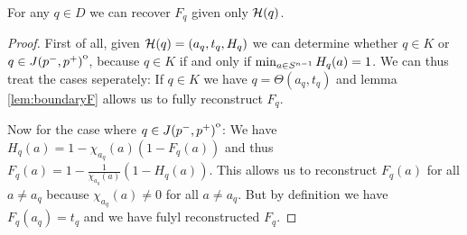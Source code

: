\begin{lemma}
    For any $q\in D$ we can recover $F_q$ given only ${\mathcal{H}}(q)$.
\end{lemma}
\begin{proof}
    First of all, given ${\mathcal{H}}(q)=(a_q,t_q, H_q)$ we can determine whether $q\in K$ or $q\in {\kern0ptJ(p^-,p^+)}^{\mathrm{o}}$, because $q\in K$ if and only if $\min_{a\in {S^{n-1}}} H_q(a)=1$. We can thus treat the cases seperately: If $q\in K$ we have $q=\Theta(a_q,t_q)$ and lemma \ref{lem:boundaryF} allows us to fully reconstruct $F_q$.

    Now for the case where $q\in {\kern0ptJ(p^-,p^+)}^{\mathrm{o}}$: We have $H_q(a)=1-\chi_{a_q}(a)(1-F_q(a))$ and thus $F_q(a) = 1-\frac{1}{\chi_{a_q}(a)}(1-H_q(a))$. This allows us to reconstruct $F_q(a)$ for all $a\neq a_q$ because $\chi_{a_q}(a)\neq 0$ for all $a\neq a_q$. But by definition we have $F_q(a_q)=t_q$ and we have fulyl reconstructed $F_q$.
\end{proof}


